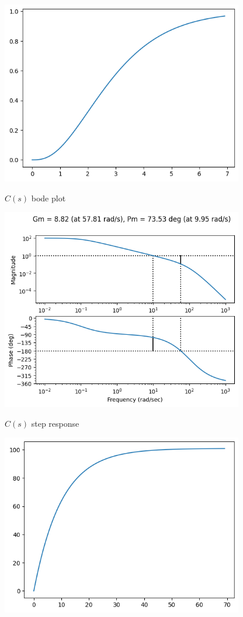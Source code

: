\documentclass[11pt]{article}
\begin{document}
\includegraphics[width=300pt]{a5_2.png}

$C(s)$ bode plot

\includegraphics[width=300pt]{a5_3.png}

$C(s)$ step response

\includegraphics[width=300pt]{a5_4.png}
\end{document}
